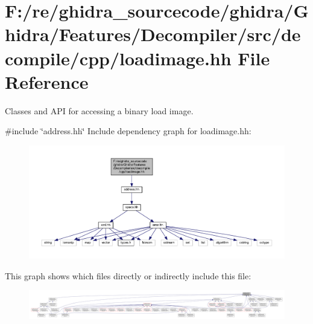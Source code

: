 \hypertarget{loadimage_8hh}{}\section{F\+:/re/ghidra\+\_\+sourcecode/ghidra/\+Ghidra/\+Features/\+Decompiler/src/decompile/cpp/loadimage.hh File Reference}
\label{loadimage_8hh}


Classes and A\+PI for accessing a binary load image.  


{\ttfamily \#include \char`\"{}address.\+hh\char`\"{}}\newline
Include dependency graph for loadimage.\+hh\+:
\nopagebreak
\begin{figure}[H]
\begin{center}
\leavevmode
\includegraphics[width=350pt]{loadimage_8hh__incl}
\end{center}
\end{figure}
This graph shows which files directly or indirectly include this file\+:
\nopagebreak
\begin{figure}[H]
\begin{center}
\leavevmode
\includegraphics[width=350pt]{loadimage_8hh__dep__incl}
\end{center}
\end{figure}
